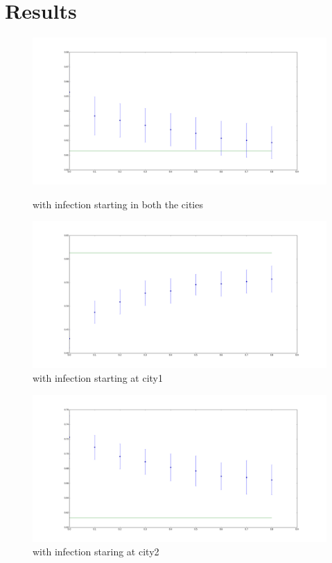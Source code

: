 \documentclass{article}
\begin{document}
\section{Results}
\begin{figure}[H]
  \includegraphics[width=\textwidth]{long_run}
\caption{with infection starting in both the cities}
\includegraphics[width=\textwidth]{city1_inf}
\caption{with infection starting at city1}
\end{figure}
\begin{figure}
\includegraphics[width=\textwidth]{city2_inf}
\caption{with infection staring at city2}
\end{figure}  
\end{document}
